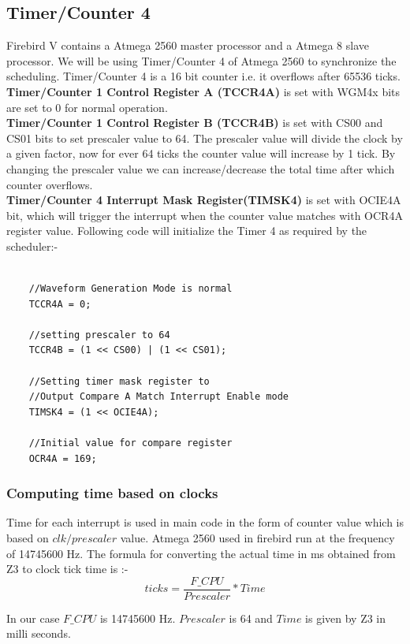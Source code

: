 \documentclass[16pt]{report}
\begin{document}
\subsection{Timer/Counter 4}
Firebird V contains a Atmega 2560 master processor and a Atmega 8 slave processor. We will be using Timer/Counter 4 of Atmega 2560 to synchronize the scheduling.
Timer/Counter 4 is a 16 bit counter i.e. it overflows after 65536 ticks.\\
\textbf{Timer/Counter 1 Control Register A (TCCR4A)} is set with WGM4x bits are set to 0 for normal operation.\\
\textbf{Timer/Counter 1 Control Register B (TCCR4B)} is set with CS00 and CS01 bits to set prescaler value to 64. The prescaler value will divide the clock by a given factor, now for ever 64 ticks the counter value will increase by 1 tick. By changing the prescaler value we can increase/decrease the total time after which counter overflows.\\
\textbf{Timer/Counter 4 Interrupt Mask Register(TIMSK4)} is set with OCIE4A bit, which will trigger the interrupt when the counter value matches with OCR4A register value.
Following code will initialize the Timer 4 as required by the scheduler:-

\begin{verbatim}

    //Waveform Generation Mode is normal
    TCCR4A = 0;
    
    //setting prescaler to 64
    TCCR4B = (1 << CS00) | (1 << CS01); 
    
    //Setting timer mask register to 
    //Output Compare A Match Interrupt Enable mode
    TIMSK4 = (1 << OCIE4A);
    
    //Initial value for compare register
    OCR4A = 169;
\end{verbatim}

\subsubsection{Computing time based on clocks}
Time for each interrupt is used in main code in the form of counter value which is based on $clk/prescaler$ value.
Atmega 2560 used in firebird run at the frequency of 14745600 Hz. The formula for converting the actual time in ms obtained from Z3 to clock tick time is :-
\begin{equation}
    ticks = \frac{F\_CPU}{Prescaler} * Time
\end{equation}

In our case $F\_CPU$ is 14745600 Hz. $Prescaler$ is 64 and $Time$ is given by Z3 in milli seconds.
\end{document}
